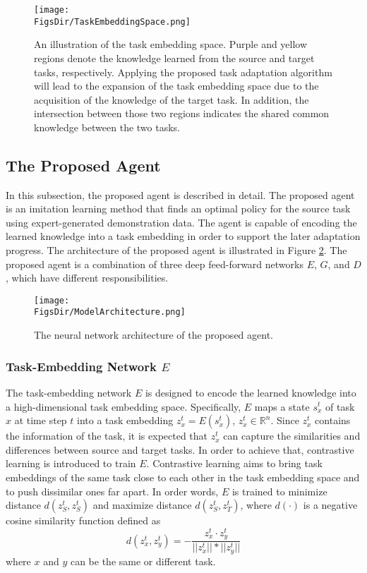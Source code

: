 \begin{figure}[htbp!]
  \centering
  \texttt{[image: \\FigsDir/TaskEmbeddingSpace.png]}
  \caption{An illustration of the task embedding space. Purple and yellow regions denote the knowledge learned from the source and target tasks, respectively. Applying the proposed task adaptation algorithm will lead to the expansion of the task embedding space due to the acquisition of the knowledge of the target task. In addition, the intersection between those two regions indicates the shared common knowledge between the two tasks.}
  \label{ch:DTAIL:fig:TaskEmbeddingSpace}
\end{figure}
\unskip


\subsection{The Proposed \DTAIL{} Agent}
In this subsection, the proposed agent is described in detail.
The proposed agent is an imitation learning method that finds an optimal policy for the source task using expert-generated demonstration data.
The agent is capable of encoding the learned knowledge into a task embedding in order to support the later adaptation progress.
The architecture of the proposed agent is illustrated in Figure \ref{ch:DTAIL:fig:Architecture}.
The proposed agent is a combination of three deep feed-forward networks $E$, $G$, and $D$, which have different responsibilities.


\begin{figure}[htbp!]
  \centering
  \texttt{[image: \\FigsDir/ModelArchitecture.png]}
  \caption{The neural network architecture of the proposed agent.}
  \label{ch:DTAIL:fig:Architecture}
\end{figure}
\unskip


\subsubsection{Task-Embedding Network $E$}


The task-embedding network $E$ is designed to encode the learned knowledge into a high-dimensional task embedding space.
Specifically,
$E$ maps a state $s^t_x$ of task $x$ at time step $t$ into a task embedding $z^t_x = E(s^t_x)$, $z^t_x \in \mathbb{R}^n$.
Since $z^t_x$ contains the information of the task,
it is expected that $z^t_x$ can capture the similarities and differences between source and target tasks.
In order to achieve that,
contrastive learning is introduced to train $E$.
Contrastive learning aims to bring task embeddings of the same task close to each other in the task embedding space and to push dissimilar ones far apart.
In order words,
$E$ is trained to minimize distance $d(z^t_S, z^t_S)$ and maximize distance $d(z^t_S, z^t_T)$, where $d(\cdot)$ is a negative cosine similarity function defined as
\begin{equation}
  d(z^t_x, z^t_y) = - \frac{z^t_x \cdot z^t_y}{||z^t_x|| * ||z^t_y||}
\end{equation}
where $x$ and $y$ can be the same or different task.


